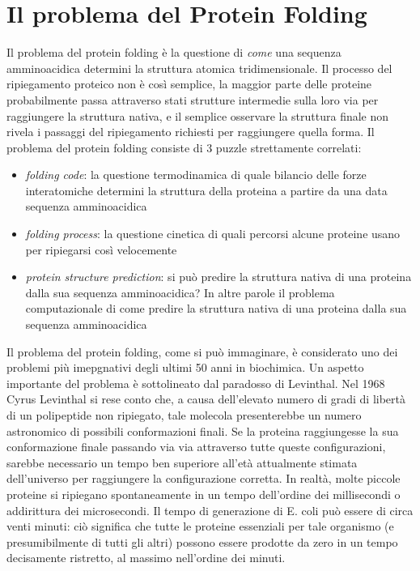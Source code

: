 \section{Il problema del Protein Folding} \label{protein-folding-problem}
{
Il problema del protein folding è la questione di \textit{come} una sequenza amminoacidica determini la struttura atomica tridimensionale. Il processo del ripiegamento proteico non è così semplice, la maggior parte delle proteine probabilmente passa attraverso stati strutture intermedie sulla loro via per raggiungere la struttura nativa, e il semplice osservare la struttura finale non rivela i passaggi del ripiegamento richiesti per raggiungere quella forma. Il problema del protein folding consiste di 3 puzzle strettamente correlati\supercite{dill2008protein}:
\begin{itemize}
	\item \textit{folding code}: la questione termodinamica di quale bilancio delle forze interatomiche determini la struttura della proteina a partire da una data sequenza amminoacidica
	
	\item \textit{folding process}: la questione cinetica di quali percorsi alcune proteine usano per ripiegarsi così velocemente
	
	\item\textit{protein structure prediction}: si può predire la struttura nativa di una proteina dalla sua sequenza amminoacidica? In altre parole il problema computazionale di come predire la struttura nativa di una proteina dalla sua sequenza amminoacidica
	
\end{itemize}	

Il problema del protein folding, come si può immaginare, è considerato uno dei problemi più imepgnativi degli ultimi 50 anni in biochimica. Un aspetto importante del problema è sottolineato dal paradosso di Levinthal. Nel 1968 Cyrus Levinthal si rese conto che, a causa dell'elevato numero di gradi di libertà di un polipeptide non ripiegato, tale molecola presenterebbe un numero astronomico di possibili conformazioni finali. Se la proteina raggiungesse la sua conformazione finale passando via via attraverso tutte queste configurazioni, sarebbe necessario un tempo ben superiore all'età attualmente stimata dell'universo per raggiungere la configurazione corretta. In realtà, molte piccole proteine si ripiegano spontaneamente in un tempo dell'ordine dei millisecondi o addirittura dei microsecondi. Il tempo di generazione di E. coli può essere di circa venti minuti: ciò significa che tutte le proteine essenziali per tale organismo (e presumibilmente di tutti gli altri) possono essere prodotte da zero in un tempo decisamente ristretto, al massimo nell'ordine dei minuti.

}
